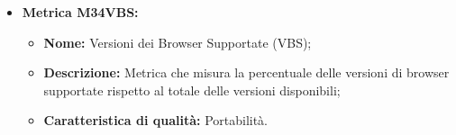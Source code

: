 \begin{itemize}
            \item \hypertarget{item:M34VBS}{\textbf{Metrica M34VBS:}}
            \begin{minipage}[t]{0.9\textwidth}
                \begin{itemize}
                    \item \textbf{Nome:} Versioni dei Browser Supportate (VBS);
                    \item \textbf{Descrizione:} Metrica che misura la percentuale delle versioni di browser supportate rispetto al totale delle versioni disponibili;
                    \item \textbf{Caratteristica di qualità:} Portabilità.
                    \end{itemize}
            \end{minipage}

\end{itemize}